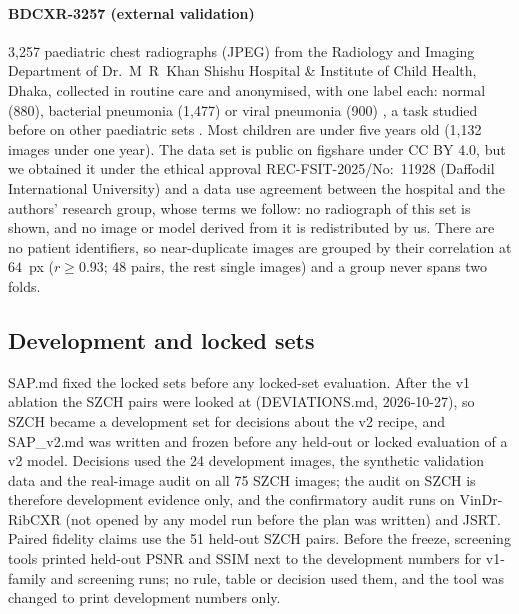 \paragraph{BDCXR-3257 (external validation)} 3,257 paediatric chest radiographs (JPEG) from the Radiology and Imaging Department of
Dr.~M~R~Khan Shishu Hospital \& Institute of Child Health, Dhaka, collected in routine care and anonymised, with one label each: normal (880),
bacterial pneumonia (1,477) or viral pneumonia (900) \citep{durjoy2026bdcxr}, a task studied before on other paediatric sets \citep{kermany2018identifying}. Most children are under five years old
(1,132 images under one year). The data set is public on figshare under CC BY 4.0, but we obtained it under the ethical approval REC-FSIT-2025/No:~11928 (Daffodil
International University) and a data use agreement between the hospital and the authors' research group, whose terms we follow: no
radiograph of this set is shown, and no image or model derived from it is redistributed by us. There are no
patient identifiers, so near-duplicate images are grouped by their correlation at $64$~px ($r\ge0.93$; 48 pairs, the rest single images) and
a group never spans two folds.

\subsection{Development and locked sets}
SAP.md fixed the locked sets before any locked-set evaluation. After the v1 ablation the SZCH pairs were looked at (DEVIATIONS.md, 2026-10-27), so SZCH
became a development set for decisions about the v2 recipe, and SAP\_v2.md was written and frozen before any held-out or locked evaluation of a v2
model. Decisions used the 24 development images, the synthetic validation data and the real-image audit on all 75 SZCH images; the audit on SZCH is
therefore development evidence only, and the confirmatory audit runs on VinDr-RibCXR (not opened by any model run before the plan was written) and
JSRT. Paired fidelity claims use the 51 held-out SZCH pairs. Before the freeze, screening tools printed held-out PSNR and SSIM next to the
development numbers for v1-family and screening runs; no rule, table or decision used them, and the tool was changed to print development
numbers only.

